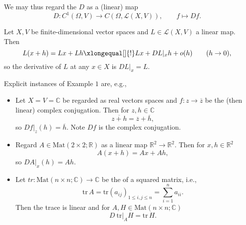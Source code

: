 \documentclass[10pt]{article}
\let\emph\relax %
\newcommand{\C}{\mathbb{C}}
\newcommand{\R}{\mathbb{R}}
\renewcommand{\L}{\mathcal{L}}
\begin{document}
  We may thus regard the \emph{derivative} $D$ as a (linear) map
  \[
    D:C^{1}(\Omega,V) \rightarrow C(\Omega,\L(X,V)),\qquad f \mapsto Df.  
  \]

  \begin{example}
    Let $X,V$ be finite-dimensional vector spaces and $L \in \L(X,V)$ a linear map. Then
    \[L(x+h) = Lx+Lh \xlongequal[]{!} Lx + DL|_{x}h + o(h) \qquad (h \rightarrow 0),\]
    so the derivative of $L$ at any $x \in X$ is $DL|_{x} = L$.
  \end{example}

  \begin{example}
    Explicit instances of Example $1$ are, e.g.,
    \begin{itemize}
      \item Let $X = V = \C$ be regarded as real vectors spaces and $f:z \to \overline{z}$ be the (then linear) complex conjugation.
      Then for $z,h \in \C$
      \[
        \overline{z+h} = \overline{z} + \overline{h},  
      \]
      so $Df|_{z}(h) = \overline{h}$. Note $Df$ is the complex conjugation.
      
      \item Regard $A \in \text{Mat}(2 \times 2; \R)$ as a linear map $\R^{2} \to \R^{2}$. Then for $x,h \in \R^{2}$
      \[
        A(x+h) = Ax + Ah,
      \]
      so $DA|_{x}(h) = Ah$.

      \item Let $tr : \text{Mat}(n \times n;\C) \to \C$ be the \emph{trace} of a squared matrix, i.e.,
      \[
        \text{tr}\, A = \text{tr}(a_{ij})_{1 \leq i,j \leq n} = \sum_{i = 1}^{n}a_{ii}.  
      \]
      Then the trace is linear and for $A,H \in \text{Mat}(n \times n;\C)$
      \[
        D~\text{tr}|_{A}H = \text{tr}\, H.  
      \]
    \end{itemize}
  \end{example}
\end{document}
